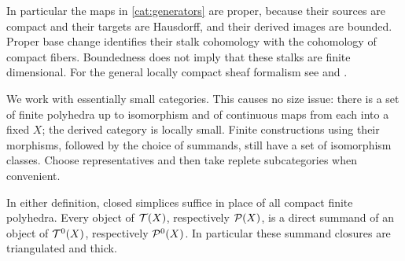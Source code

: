 In particular the maps in \eqref{cat:generators} are proper, because
their sources are compact and their targets are Hausdorff, and their
derived images are bounded.  Proper base change identifies their
stalk cohomology with the cohomology of compact fibers.  Boundedness
does not imply that these stalks are finite dimensional.
For the general locally compact sheaf formalism see
\cite[Chapter~III]{KashiwaraSchapira1990} and
\cite[\S\S11.3--11.4]{SchapiraNotes}.

We work with essentially small categories.  This causes no size issue:
there is a set of finite polyhedra up to isomorphism and of continuous maps
from each into a fixed $X$; the derived category is locally small.  Finite
constructions using their morphisms, followed by the choice of summands,
still have a set of isomorphism classes.  Choose representatives and then
take replete subcategories when convenient.

\begin{lemma}
\label{cat:simplex-generators}
In either definition, closed simplices suffice in place of all compact
finite polyhedra.  Every object of $\mathcal T(X)$, respectively $\mathcal P(X)$, is a
direct summand of an object of $\mathcal T^0(X)$, respectively $\mathcal P^0(X)$.
In particular these summand closures are triangulated and thick.
\end{lemma}

